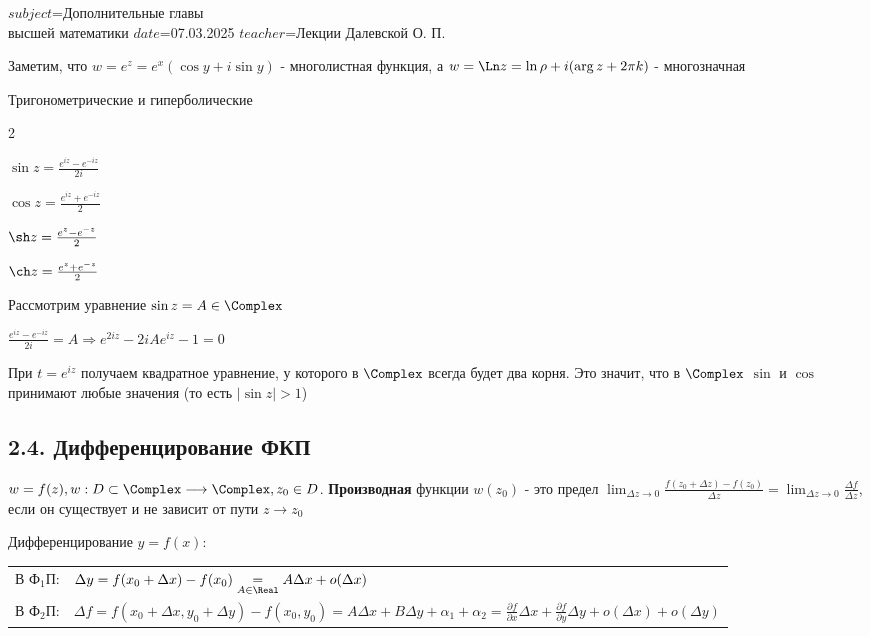 $subject$=Дополнительные главы \\ высшей математики
$date$=07.03.2025
$teacher$=Лекции Далевской О. П.

Заметим, что $w = e^z = e^x (\cos y + i \sin y)$ - многолистная функция, а $w = \Ln z = \ln \rho + i (\arg z + 2\pi k)$ - многозначная

 Тригонометрические и гиперболические

\begin{multicols}{2}
    \begin{center}
        $\sin z = \frac{e^{iz} - e^{-iz}}{2i}$

        $\cos z = \frac{e^{iz} + e^{-iz}}{2}$

        $\sh z = \frac{e^{z} - e^{-z}}{2}$

        $\ch z = \frac{e^{z} + e^{-z}}{2}$
    \end{center}
\end{multicols}

\Nota Рассмотрим уравнение $\sin z = A \in \Complex$

$\frac{e^{iz} - e^{-iz}}{2i} = A \Longrightarrow e^{2iz} - 2iAe^{iz} - 1 = 0$

При $t = e^{iz}$ получаем квадратное уравнение, у которого в $\Complex$ всегда будет два корня. 
Это значит, что в $\Complex$ $\sin$ и $\cos$ принимают любые значения (то есть $|\sin z| > 1$)

\subsection{2.4. Дифференцирование ФКП}

\Def $w = f(z), w : D \subset \Complex \longrightarrow \Complex, z_0 \in D$. \textbf{Производная} функции
$w(z_0)$ - это предел $\lim_{\Delta z \to 0} \frac{f(z_0 + \Delta z) - f(z_0)}{\Delta z} = \lim_{\Delta z \to 0} \frac{\Delta f}{\Delta z}$, 
если он существует и не зависит от пути $z \to z_0$

\Mem Дифференцирование $y = f(x)$:

\begin{tabular}{ll}
    В Ф$_1$П: & $\Delta y = f(x_0 + \Delta x) - f(x_0) \underset{A \in \Real}{=} A\Delta x + o(\Delta x)$ \\
    В Ф$_2$П: & $\Delta f = f(x_0 + \Delta x, y_0 + \Delta y) - f(x_0, y_0) = A\Delta x + B \Delta y + \alpha_1 + \alpha_2 = 
    \frac{\partial f}{\partial x} \Delta x + \frac{\partial f}{\partial y} \Delta y + o(\Delta x) + o(\Delta y)$
\end{tabular}

